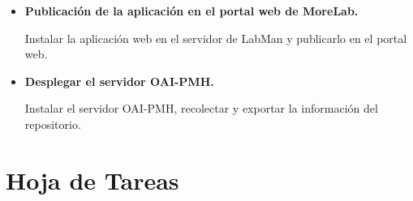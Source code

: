 \begin{itemize}
	\item \textbf{Publicación de la aplicación en el portal web de MoreLab.}
	
	Instalar la aplicación web en el servidor de LabMan y publicarlo en el portal web.
	\item \textbf{Desplegar el servidor OAI-PMH.}

	Instalar el servidor OAI-PMH, recolectar y exportar la información del repositorio.
\end{itemize}

\section{Hoja de Tareas}


